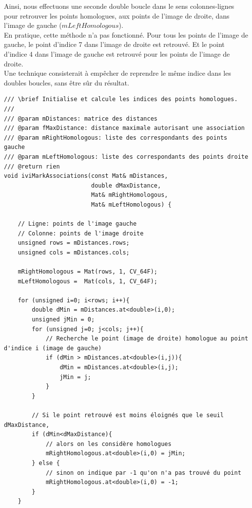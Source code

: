 \documentclass[a4paper,11pt]{article}
\begin{document}
Ainsi, nous effectuons une seconde double boucle dans le sens colonnes-lignes pour 
retrouver les points homologues, aux points de l'image de droite, dans 
l'image de gauche ($mLeftHomologous$).\\

En pratique, cette méthode n'a pas fonctionné. Pour tous les points de l'image de 
gauche, le point d'indice 7 dans l'image de droite est retrouvé. Et le point d'indice
4 dans l'image de gauche est retrouvé pour les points de l'image de droite.\\

Une technique consisterait à empêcher de reprendre le même indice dans les doubles boucles,
sans être sûr du résultat.\\

\begin{lstlisting}[caption=Fontion de recherche de points homologues]
/// \brief Initialise et calcule les indices des points homologues.
///
/// @param mDistances: matrice des distances
/// @param fMaxDistance: distance maximale autorisant une association
/// @param mRightHomologous: liste des correspondants des points gauche
/// @param mLeftHomologous: liste des correspondants des points droite
/// @return rien
void iviMarkAssociations(const Mat& mDistances,
                         double dMaxDistance,
                         Mat& mRightHomologous,
                         Mat& mLeftHomologous) {

    // Ligne: points de l'image gauche
    // Colonne: points de l'image droite
    unsigned rows = mDistances.rows;
    unsigned cols = mDistances.cols;

    mRightHomologous = Mat(rows, 1, CV_64F);
    mLeftHomologous =  Mat(cols, 1, CV_64F);

    for (unsigned i=0; i<rows; i++){
        double dMin = mDistances.at<double>(i,0);
        unsigned jMin = 0;
        for (unsigned j=0; j<cols; j++){
            // Recherche le point (image de droite) homologue au point d'indice i (image de gauche)
            if (dMin > mDistances.at<double>(i,j)){
                dMin = mDistances.at<double>(i,j);
                jMin = j;
            }
        }

        // Si le point retrouvé est moins éloignés que le seuil dMaxDistance,
        if (dMin<dMaxDistance){
            // alors on les considère homologues
            mRightHomologous.at<double>(i,0) = jMin;
        } else {
            // sinon on indique par -1 qu'on n'a pas trouvé du point
            mRightHomologous.at<double>(i,0) = -1;
        }
    }


\end{lstlisting}
\end{document}
